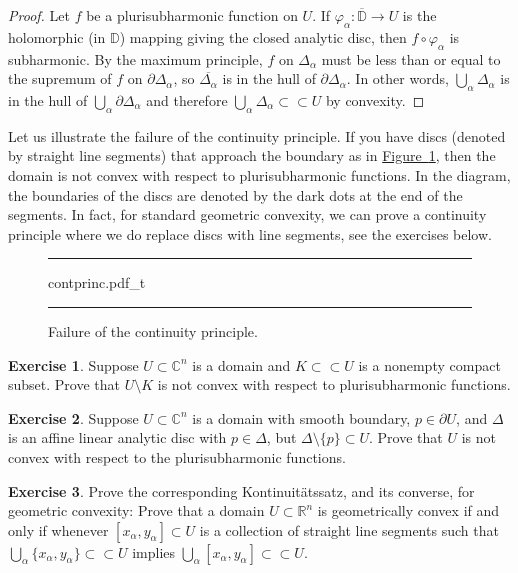 \documentclass[12pt,openany]{book}
\newcommand{\C}{{\mathbb{C}}}
\newcommand{\R}{{\mathbb{R}}}
\newcommand{\D}{{\mathbb{D}}}
\theoremstyle{plain}
\theoremstyle{remark}
\theoremstyle{definition}
\newenvironment{exbox}{%
    \def\FrameCommand{\vrule width 1pt \relax\hspace{10pt}}%
    \MakeFramed{\advance\hsize-\width\FrameRestore}%
}{%
    \endMakeFramed
}
\newenvironment{myfig}{%
\begin{figure}[h!t]
\noindent\rule{\textwidth}{0.5pt}\vspace{12pt}\par\centering}%
{\par\noindent\rule{\textwidth}{0.5pt}
\end{figure}}
\theoremstyle{exercise}
\newtheorem{exercise}{Exercise}[section]
\theoremstyle{example}
\newcommand{\figureref}[1]{\hyperref[#1]{Figure~\ref*{#1}}}
\begin{document}
\begin{proof}
Let $f$ be a plurisubharmonic function on $U$.  If $\varphi_\alpha \colon
\overline{\D} \to U$ is the holomorphic (in $\D$) mapping giving the closed
analytic disc, then $f \circ \varphi_\alpha$ is subharmonic.
By the maximum principle,
$f$ on $\Delta_\alpha$ must be less than or equal to the supremum
of $f$ on $\partial \Delta_\alpha$, so $\overline{\Delta_\alpha}$
is in the hull of
$\partial \Delta_\alpha$.
In other words,
$\bigcup_\alpha \Delta_\alpha$ is in the hull of
$\bigcup_\alpha \partial \Delta_\alpha$ and therefore
$\bigcup_\alpha \Delta_\alpha \subset \subset U$ by convexity.
\end{proof}

Let us illustrate the failure of the continuity principle.
If you have discs (denoted by straight line segments)
that approach the boundary as in \figureref{fig:contprinc},
then the domain is not convex with respect to plurisubharmonic functions.
In the diagram, the boundaries of the discs are
denoted by the dark dots at the end of the segments.
In fact, for standard geometric convexity,
we can prove a continuity principle where
we do replace discs with line segments,
see the exercises below.

\begin{myfig}
{contprinc.pdf_t}
\caption{Failure of the continuity principle.\label{fig:contprinc}}
\end{myfig}

\begin{exbox}
\begin{exercise}
Suppose $U \subset \C^n$ is a domain and $K \subset \subset U$ is a nonempty
compact subset.  Prove that $U \setminus K$ is not convex with respect to
plurisubharmonic functions.
\end{exercise}

\begin{exercise} \label{exercise:affinedisctouchingsmooth}
Suppose $U \subset \C^n$ is a domain with smooth boundary,
$p \in \partial U$,
and $\Delta$ is an affine linear analytic disc with $p \in \Delta$, but
$\Delta \setminus \{ p \} \subset U$.  Prove that $U$ is not convex with
respect to the plurisubharmonic functions.
\end{exercise}

\begin{exercise}
Prove the corresponding
Kontinuit\"atssatz, and its converse, for geometric convexity:
Prove that a domain $U \subset \R^n$ is geometrically convex if and only if
whenever $[x_\alpha,y_\alpha] \subset U$
is a collection of straight line segments such that
$\bigcup_{\alpha} \{ x_\alpha,y_\alpha \} \subset \subset U$
implies
$\bigcup_{\alpha} [ x_\alpha,y_\alpha ] \subset \subset U$.
\end{exercise}
\end{exbox}
\end{document}
